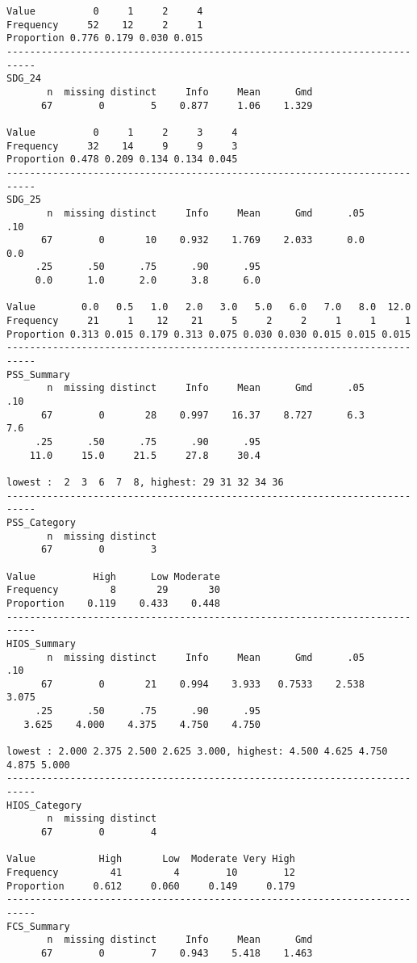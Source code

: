 \documentclass[]{article}
\begin{document}
\begin{verbatim}
Value          0     1     2     4
Frequency     52    12     2     1
Proportion 0.776 0.179 0.030 0.015
---------------------------------------------------------------------------
SDG_24 
       n  missing distinct     Info     Mean      Gmd 
      67        0        5    0.877     1.06    1.329 
                                        
Value          0     1     2     3     4
Frequency     32    14     9     9     3
Proportion 0.478 0.209 0.134 0.134 0.045
---------------------------------------------------------------------------
SDG_25 
       n  missing distinct     Info     Mean      Gmd      .05      .10 
      67        0       10    0.932    1.769    2.033      0.0      0.0 
     .25      .50      .75      .90      .95 
     0.0      1.0      2.0      3.8      6.0 
                                                                      
Value        0.0   0.5   1.0   2.0   3.0   5.0   6.0   7.0   8.0  12.0
Frequency     21     1    12    21     5     2     2     1     1     1
Proportion 0.313 0.015 0.179 0.313 0.075 0.030 0.030 0.015 0.015 0.015
---------------------------------------------------------------------------
PSS_Summary 
       n  missing distinct     Info     Mean      Gmd      .05      .10 
      67        0       28    0.997    16.37    8.727      6.3      7.6 
     .25      .50      .75      .90      .95 
    11.0     15.0     21.5     27.8     30.4 

lowest :  2  3  6  7  8, highest: 29 31 32 34 36
---------------------------------------------------------------------------
PSS_Category 
       n  missing distinct 
      67        0        3 
                                     
Value          High      Low Moderate
Frequency         8       29       30
Proportion    0.119    0.433    0.448
---------------------------------------------------------------------------
HIOS_Summary 
       n  missing distinct     Info     Mean      Gmd      .05      .10 
      67        0       21    0.994    3.933   0.7533    2.538    3.075 
     .25      .50      .75      .90      .95 
   3.625    4.000    4.375    4.750    4.750 

lowest : 2.000 2.375 2.500 2.625 3.000, highest: 4.500 4.625 4.750 4.875 5.000
---------------------------------------------------------------------------
HIOS_Category 
       n  missing distinct 
      67        0        4 
                                                  
Value           High       Low  Moderate Very High
Frequency         41         4        10        12
Proportion     0.612     0.060     0.149     0.179
---------------------------------------------------------------------------
FCS_Summary 
       n  missing distinct     Info     Mean      Gmd 
      67        0        7    0.943    5.418    1.463 
                                                    

\end{verbatim}
\end{document}
